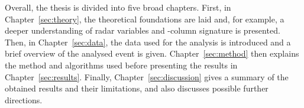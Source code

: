 Overall, the thesis is divided into five broad chapters. First, in Chapter~\ref{sec:theory}, the theoretical foundations are laid and, for example, a deeper understanding of radar variables and \zdr-column signature is presented. Then, in Chapter~\ref{sec:data}, the data used for the analysis is introduced and a brief overview of the analysed event is given. Chapter~\ref{sec:method} then explains the method and algorithms used before presenting the results in Chapter~\ref{sec:results}. Finally, Chapter~\ref{sec:discussion} gives a summary of the obtained results and their limitations, and also discusses possible further directions.

